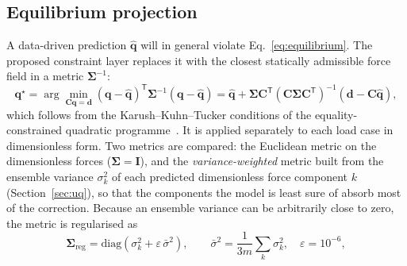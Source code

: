 \subsection{Equilibrium projection}\label{sec:projection}
A data-driven prediction $\hat{\mathbf{q}}$ will in general violate Eq.~\eqref{eq:equilibrium}. The proposed constraint layer replaces it with the closest statically admissible force field in a metric $\boldsymbol{\Sigma}^{-1}$:
\begin{equation}\label{eq:projection}
\mathbf{q}^\star = \arg\min_{\mathbf{C}\mathbf{q}=\mathbf{d}} (\mathbf{q}-\hat{\mathbf{q}})^{\mathsf T}\boldsymbol{\Sigma}^{-1}(\mathbf{q}-\hat{\mathbf{q}})
= \hat{\mathbf{q}} + \boldsymbol{\Sigma}\mathbf{C}^{\mathsf T}\left(\mathbf{C}\boldsymbol{\Sigma}\mathbf{C}^{\mathsf T}\right)^{-1}\left(\mathbf{d}-\mathbf{C}\hat{\mathbf{q}}\right),
\end{equation}
which follows from the Karush--Kuhn--Tucker conditions of the equality-constrained quadratic programme~\cite{nocedal2006numerical}. It is applied separately to each load case in dimensionless form. Two metrics are compared: the Euclidean metric on the dimensionless forces ($\boldsymbol{\Sigma}=\mathbf{I}$), and the \emph{variance-weighted} metric built from the ensemble variance $\sigma_k^2$ of each predicted dimensionless force component $k$ (Section~\ref{sec:uq}), so that the components the model is least sure of absorb most of the correction. Because an ensemble variance can be arbitrarily close to zero, the metric is regularised as
\begin{equation}\label{eq:sigmareg}
\boldsymbol{\Sigma}_\mathrm{reg} = \mathrm{diag}\!\left(\sigma_k^2 + \varepsilon\,\bar{\sigma}^2\right), \qquad \bar\sigma^2 = \frac{1}{3m}\sum_k \sigma_k^2,\quad \varepsilon = 10^{-6},
\end{equation}
